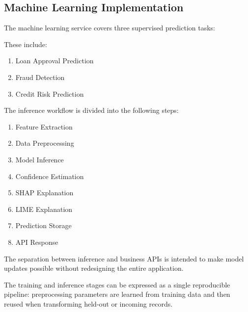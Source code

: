 \documentclass[conference]{IEEEtran}
\begin{document}
\subsection{Machine Learning Implementation}

The machine learning service covers three supervised prediction tasks:

These include:

\begin{enumerate}

\item Loan Approval Prediction

\item Fraud Detection

\item Credit Risk Prediction

\end{enumerate}

The inference workflow is divided into the following steps:

\begin{enumerate}

\item Feature Extraction

\item Data Preprocessing

\item Model Inference

\item Confidence Estimation

\item SHAP Explanation

\item LIME Explanation

\item Prediction Storage

\item API Response

\end{enumerate}

The separation between inference and business APIs is intended to make model updates possible without redesigning the entire application.

The training and inference stages can be expressed as a single reproducible pipeline: preprocessing parameters are learned from training data and then reused when transforming held-out or incoming records.
\end{document}
